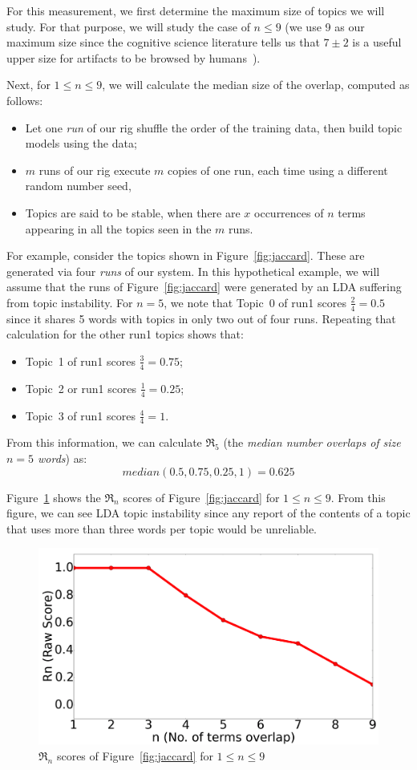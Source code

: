 \documentclass[twocolumn,5p,sort&compress]{elsarticle}
\newcommand{\bi}{\begin{itemize}}
\newcommand{\ei}{\end{itemize}}
\theoremstyle{break}
\begin{document}
For this measurement, we first determine the maximum size of topics we will study. For that purpose,
we will study the case of $n \le 9$ (we use 9 as our maximum size since the cognitive
science literature tells us that $7\pm 2$ is a useful upper size for artifacts to be browsed by humans~\cite{miller1956magical}).


Next, for $1 \le n \le 9$, we will calculate the median size of the overlap,
computed as follows:
\bi
\item Let one {\em run} of our rig shuffle the order of the training data, then build topic models using the data;
  \item $m$ runs of our rig execute $m$ copies of one run, each time using a different random number seed,
\item Topics are said to be stable,
when there are $x$ occurrences of  $n$ terms appearing in all the topics seen in the $m$ runs.
\ei


For example, consider the topics shown in Figure~\ref{fig:jaccard}. These are generated via four {\em runs} of our system. In this hypothetical example, we will assume that the runs of
 Figure~\ref{fig:jaccard} were generated by an LDA suffering from topic instability.
For $n=5$, we note that Topic~0 of run1 scores $\frac{2}{4}=0.5$ since it shares 5 words with topics in only two out of four runs.
Repeating that calculation for the other run1 topics shows that:
\bi
\item Topic~1 of run1 scores $\frac{3}{4}=0.75$;
\item Topic~2 or run1 scores $\frac{1}{4}=0.25$;
\item Topic~3 of run1 scores $\frac{4}{4}=1$.
  \ei
  From this information, we can calculate
  $\Re_5$  (the
  {\em median number overlaps of size $n=5$ words}) as:
  \[
   \mathit{median}(0.5, 0.75, 0.25, 1) =0.625\]

  Figure~\ref{fig:alln}
  shows the $\Re_n$ scores of 
  Figure~\ref{fig:jaccard} for $1 \le n \le 9$.  From this figure, we can see LDA topic instability
  since
  any report of the contents of a topic that uses more than three words per topic would be unreliable.

  \begin{figure}[!h]
  \includegraphics[width=\linewidth]{./fig/alln.png}
  \caption{$\Re_n$ scores of 
  Figure~\ref{fig:jaccard} for $1 \le n \le 9$}
  \label{fig:alln}
\end{figure}
\end{document}
